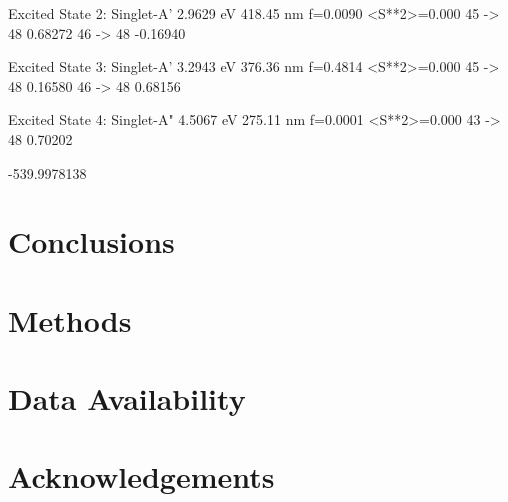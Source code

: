 \documentclass[12pt]{article}
\begin{document}
 Excited State   2:      Singlet-A'     2.9629 eV  418.45 nm  f=0.0090  <S**2>=0.000
      45 -> 48         0.68272
      46 -> 48        -0.16940

 Excited State   3:      Singlet-A'     3.2943 eV  376.36 nm  f=0.4814  <S**2>=0.000
      45 -> 48         0.16580
      46 -> 48         0.68156

 Excited State   4:      Singlet-A"     4.5067 eV  275.11 nm  f=0.0001  <S**2>=0.000
      43 -> 48         0.70202

-539.9978138

\section*{Conclusions}



\section*{Methods}


\section*{Data Availability}

\section*{Acknowledgements}




%
%




\end{document}
